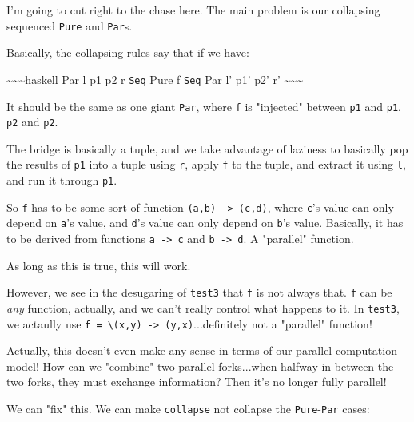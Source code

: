 \documentclass[]{article}
\begin{document}
I'm going to cut right to the chase here. The main problem is our collapsing
sequenced \texttt{Pure} and \texttt{Par}s.

Basically, the collapsing rules say that if we have:

\textasciitilde{}\textasciitilde{}\textasciitilde{}haskell Par l p1 p2 r
\texttt{Seq} Pure f \texttt{Seq} Par l' p1' p2' r'
\textasciitilde{}\textasciitilde{}\textasciitilde{}

It should be the same as one giant \texttt{Par}, where \texttt{f} is "injected"
between \texttt{p1} and \texttt{p1\textquotesingle{}}, \texttt{p2} and
\texttt{p2\textquotesingle{}}.

The bridge is basically a tuple, and we take advantage of laziness to basically
pop the results of \texttt{p1} into a tuple using \texttt{r}, apply \texttt{f}
to the tuple, and extract it using \texttt{l}, and run it through
\texttt{p1\textquotesingle{}}.

So \texttt{f} has to be some sort of function
\texttt{(a,b)\ -\textgreater{}\ (c,d)}, where \texttt{c}'s value can only depend
on \texttt{a}'s value, and \texttt{d}'s value can only depend on \texttt{b}'s
value. Basically, it has to be derived from functions
\texttt{a\ -\textgreater{}\ c} and \texttt{b\ -\textgreater{}\ d}. A "parallel"
function.

As long as this is true, this will work.

However, we see in the desugaring of \texttt{test3} that \texttt{f} is not
always that. \texttt{f} can be \emph{any} function, actually, and we can't
really control what happens to it. In \texttt{test3}, we actaully use
\texttt{f\ =\ \textbackslash{}(x,y)\ -\textgreater{}\ (y,x)}...definitely not a
"parallel" function!

Actually, this doesn't even make any sense in terms of our parallel computation
model! How can we "combine" two parallel forks...when halfway in between the two
forks, they must exchange information? Then it's no longer fully parallel!

We can "fix" this. We can make \texttt{collapse} not collapse the
\texttt{Pure}-\texttt{Par} cases:
\end{document}
